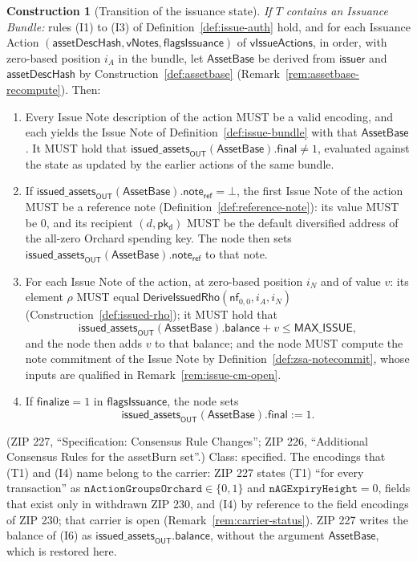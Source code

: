 \documentclass[11pt,a4paper]{article}
\theoremstyle{definition}
\newtheorem{construction}[theorem]{Construction}
\newcommand{\nfsym}{\mathsf{nf}}
\newcommand{\pkd}{\ensuremath{\mathsf{pk_d}}}
\begin{document}
\begin{construction}[Transition of the issuance state]
\emph{If $T$ contains an Issuance Bundle:} rules (I1) to (I3) of
Definition~\ref{def:issue-auth} hold, and for each Issuance Action
$(\mathsf{assetDescHash},\allowbreak \mathsf{vNotes},\allowbreak
\mathsf{flagsIssuance})$ of $\mathsf{vIssueActions}$, in order, with
zero-based position $i_A$ in the bundle, let $\mathsf{AssetBase}$ be
derived from $\mathsf{issuer}$ and $\mathsf{assetDescHash}$ by
Construction~\ref{def:assetbase} (Remark~\ref{rem:assetbase-recompute}).
Then:
\begin{enumerate}[leftmargin=3.2em]
\item[(I4)] Every Issue Note description of the action MUST be a valid
  encoding, and each yields the Issue Note of
  Definition~\ref{def:issue-bundle} with that $\mathsf{AssetBase}$. It MUST
  hold that
  $\mathsf{issued\_assets}_{\mathsf{OUT}}(\mathsf{AssetBase}).\mathsf{final}
  \neq 1$, evaluated against the state as updated by the earlier actions of
  the same bundle.
\item[(I5)] If
  $\mathsf{issued\_assets}_{\mathsf{OUT}}(\mathsf{AssetBase}).
  \mathsf{note}_{\mathsf{ref}} = \bot$, the first Issue Note of the action
  MUST be a reference note (Definition~\ref{def:reference-note}): its value
  MUST be $0$, and its recipient $(d, \pkd)$ MUST be the default diversified
  address of the all-zero Orchard spending key. The node then sets
  $\mathsf{issued\_assets}_{\mathsf{OUT}}(\mathsf{AssetBase}).
  \mathsf{note}_{\mathsf{ref}}$ to that note.
\item[(I6)] For each Issue Note of the action, at zero-based position $i_N$
  and of value $v$: its element $\rho$ MUST equal
  $\mathsf{DeriveIssuedRho}(\nfsym_{0,0}, i_A, i_N)$
  (Construction~\ref{def:issued-rho}); it MUST hold that
  \[
    \mathsf{issued\_assets}_{\mathsf{OUT}}(\mathsf{AssetBase}).\mathsf{balance}
    + v \le \mathsf{MAX\_ISSUE},
  \]
  and the node then adds $v$ to that balance; and the node MUST compute the
  note commitment of the Issue Note by Definition~\ref{def:zsa-notecommit},
  whose inputs are qualified in Remark~\ref{rem:issue-cm-open}.
\item[(I7)] If $\mathsf{finalize} = 1$ in $\mathsf{flagsIssuance}$, the
  node sets
  \[
    \mathsf{issued\_assets}_{\mathsf{OUT}}(\mathsf{AssetBase}).\mathsf{final}
    := 1.
  \]
\end{enumerate}
(ZIP 227, ``Specification: Consensus Rule Changes''; ZIP 226, ``Additional
Consensus Rules for the assetBurn set''.) Class: specified. The encodings
that (T1) and (I4) name belong to the carrier: ZIP 227 states (T1) ``for
every transaction'' as $\mathtt{nActionGroupsOrchard} \in \{0, 1\}$ and
$\mathtt{nAGExpiryHeight} = 0$, fields that exist only in withdrawn ZIP 230,
and (I4) by reference to the field encodings of ZIP 230; that carrier is open
(Remark~\ref{rem:carrier-status}). ZIP 227 writes the balance of (I6) as
$\mathsf{issued\_assets}_{\mathsf{OUT}}.\mathsf{balance}$, without the
argument $\mathsf{AssetBase}$, which is restored here.
\end{construction}
\end{document}
